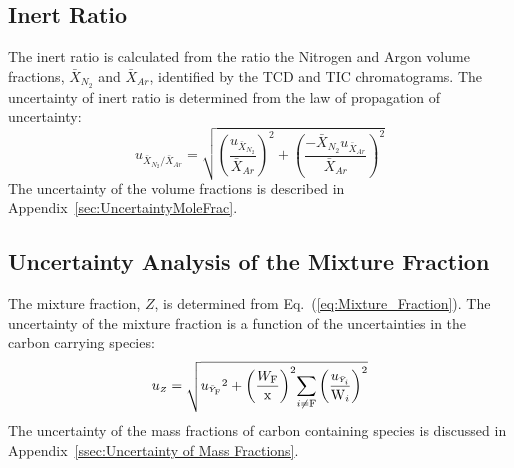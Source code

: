 \documentclass[12pt]{article}
\begin{document}
\subsection{Inert Ratio}
\label{ssec:Inert_ratio}
The inert ratio is calculated from the ratio the Nitrogen and Argon volume fractions, $\bar{X}_{N_2}$ and $\bar{X}_{Ar}$, identified by the TCD and TIC chromatograms. The uncertainty of inert ratio is determined from the law of propagation of uncertainty:
\begin{equation}
\label{eq:inert_ratio_uncertainty}
u_{\scriptscriptstyle \bar{X}_{N_2}/\bar{X}_{Ar}} = \sqrt{{\left(\frac{u_{\scriptscriptstyle \bar{X}_{N_2}}}{\bar{X}_{Ar}}\right)}^2+{\left(\frac{-\bar{X}_{N_2}u_{\scriptscriptstyle \bar{X}_{Ar}}}{\bar{X}_{Ar}}\right)}^2}
\end{equation}
The uncertainty of the volume fractions is described in Appendix~\ref{sec:UncertaintyMoleFrac}.

\pagebreak

\subsection{Uncertainty Analysis of the Mixture Fraction}\label{sec:Uncertainty_Mix_Frac}

The mixture fraction, $Z$, is determined from Eq.~(\ref{eq:Mixture_Fraction}). The uncertainty of the mixture fraction is a function of the uncertainties in the carbon carrying species:
\begin{equation}
\label{eq:mixture_frac_uncertainty}
u_{\scriptscriptstyle Z}=\sqrt{{u_{\scriptscriptstyle \bar{Y}_{\rm F}}}^2+{\left(\frac{W_{\rm F}}{\rm x}\right)}^2{\sum_{i\ne {\rm F}}{\left(\frac{u_{\scriptscriptstyle \bar{Y}_{i}}}{\textrm{W}_{i}} \right)}^2}}
\end{equation}
The uncertainty of the mass fractions of carbon containing species is discussed in Appendix~\ref{ssec:Uncertainty of Mass Fractions}.

\pagebreak


\end{document}
